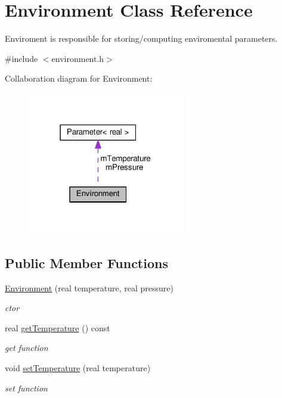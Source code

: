 \hypertarget{classEnvironment}{}\section{Environment Class Reference}
\label{classEnvironment}


Enviroment is responsible for storing/computing enviromental parameters.  




{\ttfamily \#include $<$environment.\+h$>$}



Collaboration diagram for Environment\+:
\nopagebreak
\begin{figure}[H]
\begin{center}
\leavevmode
\includegraphics[width=195pt]{classEnvironment__coll__graph}
\end{center}
\end{figure}
\subsection*{Public Member Functions}
\begin{DoxyCompactItemize}
\item 
\hyperlink{classEnvironment_a61012e8e0cfa5b8181e715a96211c2d8}{Environment} (real temperature, real pressure)
\begin{DoxyCompactList}\small\item\em ctor \end{DoxyCompactList}\item 
real \hyperlink{classEnvironment_a520f5872c242108b6dc06a9c06859516}{get\+Temperature} () const 
\begin{DoxyCompactList}\small\item\em get function \end{DoxyCompactList}\item 
void \hyperlink{classEnvironment_af7c2756f2d541b69f75234ccc5a5aa2c}{set\+Temperature} (real temperature)\hypertarget{classEnvironment_af7c2756f2d541b69f75234ccc5a5aa2c}{}\label{classEnvironment_af7c2756f2d541b69f75234ccc5a5aa2c}

\begin{DoxyCompactList}\small\item\em set function \end{DoxyCompactList}\end{DoxyCompactItemize}
